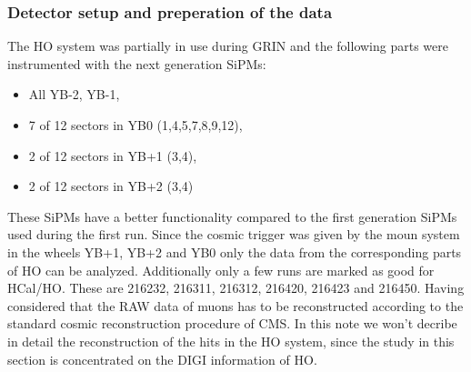 		\subsubsection{Detector setup and preperation of the data}
			The HO system was partially in use during GRIN and the following parts were instrumented with the next generation SiPMs:
			\begin{itemize}
				\item All YB-2, YB-1,
				\item 7 of 12 sectors in YB0 (1,4,5,7,8,9,12),
				\item 2 of 12 sectors in YB+1 (3,4),
				\item 2 of 12 sectors in YB+2 (3,4)
			\end{itemize}
			These SiPMs have a better functionality compared to the first generation SiPMs used during the first run.
			Since the cosmic trigger was given by the moun system in the wheels YB+1, YB+2 and YB0 only the data from the corresponding parts of HO can be analyzed.
			Additionally only a few runs are marked as good for HCal/HO.
			These are 216232, 216311, 216312, 216420, 216423 and 216450.
			Having considered that the RAW data of muons has to be reconstructed according to the standard cosmic reconstruction procedure of CMS.
			In this note we won't decribe in detail the reconstruction of the hits in the HO system, since the study in this section is concentrated on the DIGI information of HO.
